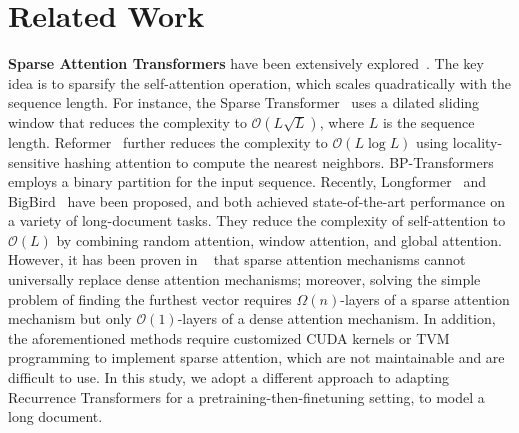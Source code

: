 \documentclass[11pt,a4paper]{article}
\begin{document}
\section{Related Work}\label{sec:related-work}
\noindent\textbf{Sparse Attention Transformers} have been extensively explored~\citep{sparse_transformer,tay2020sparse,beltagy2020longformer,zaheer2020big}. The key idea is to sparsify the self-attention operation, which scales quadratically with the sequence length. For instance, the Sparse Transformer~\citep{sparse_transformer} uses a dilated sliding window that reduces the complexity to $ \mathcal{O}(L\sqrt{L})$, where $L$ is the sequence length. Reformer~\citep{kitaev2020reformer} further reduces the complexity to $ \mathcal{O}(L\log{L})$ using locality-sensitive hashing attention to compute the nearest neighbors. BP-Transformers ~\citep{ye2019bp} employs a binary partition for the input sequence. Recently, Longformer~\citep{beltagy2020longformer} and BigBird~\citep{zaheer2020big} have been proposed, and both achieved state-of-the-art performance on a variety of long-document tasks. They reduce the complexity of self-attention to $\mathcal{O}(L)$ by combining random attention, window attention, and global attention. However, it has been proven in ~\citet{zaheer2020big} that sparse attention mechanisms cannot universally replace dense attention mechanisms; moreover, solving the simple problem of finding the furthest vector requires $\Omega(n)$-layers of a sparse attention mechanism but only $\mathcal{O}(1)$-layers of a dense attention mechanism. In addition, the aforementioned methods require customized CUDA kernels or TVM programming to implement sparse attention, which are not maintainable and are difficult to use. In this study, we adopt a different approach to adapting Recurrence Transformers for a pretraining-then-finetuning setting, to model a long document.  
\end{document}
